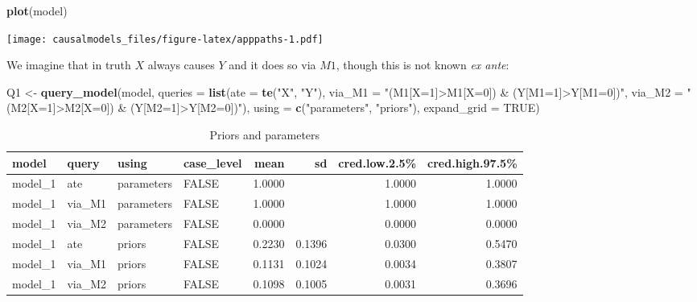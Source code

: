\documentclass[
  12pt,
]{book}
\newenvironment{Shaded}{\begin{snugshade}}{\end{snugshade}}
\newcommand{\AttributeTok}[1]{\textcolor[rgb]{0.13,0.29,0.53}{#1}}
\newcommand{\ConstantTok}[1]{\textcolor[rgb]{0.56,0.35,0.01}{#1}}
\newcommand{\FunctionTok}[1]{\textcolor[rgb]{0.13,0.29,0.53}{\textbf{#1}}}
\newcommand{\NormalTok}[1]{#1}
\newcommand{\OtherTok}[1]{\textcolor[rgb]{0.56,0.35,0.01}{#1}}
\newcommand{\StringTok}[1]{\textcolor[rgb]{0.31,0.60,0.02}{#1}}
\begin{document}
\begin{Shaded}
\begin{Highlighting}[]
\FunctionTok{plot}\NormalTok{(model)}
\end{Highlighting}
\end{Shaded}

\texttt{[image: causalmodels\_files/figure-latex/apppaths-1.pdf]}

We imagine that in truth \(X\) always causes \(Y\) and it does so via \(M1\), though this is not known \emph{ex ante}:

\begin{Shaded}
\begin{Highlighting}[]
\NormalTok{Q1 }\OtherTok{\textless{}{-}} \FunctionTok{query\_model}\NormalTok{(model, }
  \AttributeTok{queries =} \FunctionTok{list}\NormalTok{(}\AttributeTok{ate =} \FunctionTok{te}\NormalTok{(}\StringTok{"X"}\NormalTok{, }\StringTok{"Y"}\NormalTok{), }
                 \AttributeTok{via\_M1 =} \StringTok{"(M1[X=1]\textgreater{}M1[X=0]) \& (Y[M1=1]\textgreater{}Y[M1=0])"}\NormalTok{, }
                 \AttributeTok{via\_M2 =} \StringTok{"(M2[X=1]\textgreater{}M2[X=0]) \& (Y[M2=1]\textgreater{}Y[M2=0])"}\NormalTok{), }
  \AttributeTok{using =} \FunctionTok{c}\NormalTok{(}\StringTok{"parameters"}\NormalTok{, }\StringTok{"priors"}\NormalTok{),}
  \AttributeTok{expand\_grid =} \ConstantTok{TRUE}\NormalTok{) }
\end{Highlighting}
\end{Shaded}

\begin{table}

\caption{\label{tab:apppaths3}Priors and parameters}
\centering
\begin{tabular}[t]{l|l|l|l|r|r|r|r}
\hline
model & query & using & case\_level & mean & sd & cred.low.2.5\% & cred.high.97.5\%\\
\hline
model\_1 & ate & parameters & FALSE & 1.0000 &  & 1.0000 & 1.0000\\
\hline
model\_1 & via\_M1 & parameters & FALSE & 1.0000 &  & 1.0000 & 1.0000\\
\hline
model\_1 & via\_M2 & parameters & FALSE & 0.0000 &  & 0.0000 & 0.0000\\
\hline
model\_1 & ate & priors & FALSE & 0.2230 & 0.1396 & 0.0300 & 0.5470\\
\hline
model\_1 & via\_M1 & priors & FALSE & 0.1131 & 0.1024 & 0.0034 & 0.3807\\
\hline
model\_1 & via\_M2 & priors & FALSE & 0.1098 & 0.1005 & 0.0031 & 0.3696\\
\hline
\end{tabular}
\end{table}
\end{document}

